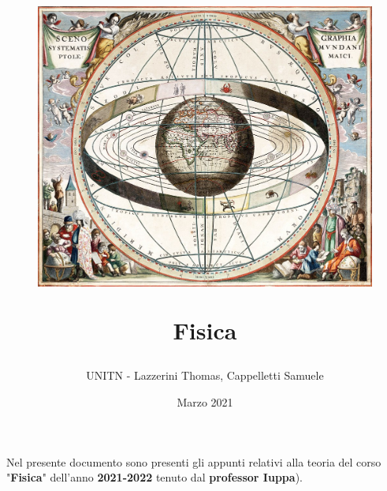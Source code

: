 \documentclass[12pt]{article}
\title{
    \begin{figure}[ht!]
        \centering
        \includegraphics[width=.5\textwidth]{LOGO1}
    \end{figure}
    \bigskip
    Fisica
}
\author{UNITN - Lazzerini Thomas, Cappelletti Samuele}
\date{Marzo 2021}
\begin{document}
    \maketitle
    \vfill

    \begin{center}
        Nel presente documento sono presenti gli appunti relativi alla teoria del corso "\textbf{Fisica}" dell'anno \textbf{2021-2022} tenuto dal \textbf{professor Iuppa}).\\
    \end{center}

    \newpage

    \tableofcontents

    \newpage

	
\end{document}
